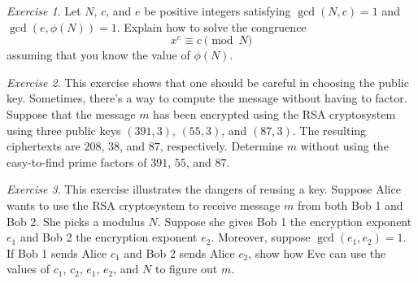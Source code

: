 \documentclass{article}
\theoremstyle{definition}
\theoremstyle{remark}
\newtheorem{exercise}{Exercise}
\begin{document}
    \begin{exercise}
        Let \(N\), \(c\), and \(e\) be positive integers satisfying \(\gcd(N,c)=1\) and \(\gcd(e,\phi(N))=1\).
        Explain how to solve the congruence
        \[x^e \equiv c\pmod{N}\]
        assuming that you know the value of \(\phi(N)\).
    \end{exercise}

    \begin{exercise}
        This exercise shows that one should be careful in choosing the public key.
        Sometimes, there's a way to compute the message without having to factor.
        Suppose that the message \(m\) has been encrypted using the RSA cryptosystem using three public keys \((391,3)\), \((55,3)\), and \((87,3)\).
        The resulting ciphertexts are \(208\), \(38\), and \(87\), respectively.
        Determine \(m\) without using the easy-to-find prime factors of \(391\), \(55\), and \(87\).
    \end{exercise}
    \iffalse
    Solution:
    We are trying to find a solution to the system
    \begin{align*}
        38 &\equiv m^3 \pmod{55}\\
        32 &\equiv m^3 \pmod{87}\\
        208 &\equiv m^3 \pmod{391}.
    \end{align*}
    Apply Chinese Remainder Theorem to get a value for \(x = m^3\) modulo \(55\cdot 87\cdot 391 = 1870935\).
    Lots of computation shows that \(x \equiv 103823\pmod{1870935}\).
    Taking the cube root gets \(m = \sqrt[3]{103823} = 47\).

    Note that this problem requires some fluency with the Chinese Remainder Theorem.
    \fi

    \begin{exercise}
        This exercise illustrates the dangers of reusing a key.
        Suppose Alice wants to use the RSA cryptosystem to receive message \(m\) from both Bob 1 and Bob 2.
        She picks a modulus \(N\).
        Suppose she gives Bob 1 the encryption exponent \(e_1\) and Bob 2 the encryption exponent \(e_2\).
        Moreover, suppose \(\gcd(e_1,e_2)=1\).
        If Bob 1 sends Alice \(c_1\) and Bob 2 sends Alice \(c_2\), show how Eve can use the values of \(c_1\), \(c_2\), \(e_1\), \(e_2\), and \(N\) to figure out \(m\).
    \end{exercise}
    \iffalse
    Solution: 
    Use Bezout's lemma to get \(e_1 x + e_2 y = 1\) and consider \(c_1^x c_2^y\).
    \fi
\end{document}
